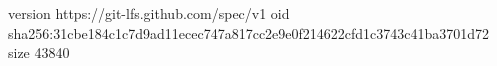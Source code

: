 version https://git-lfs.github.com/spec/v1
oid sha256:31cbe184c1c7d9ad11ecec747a817cc2e9e0f214622cfd1c3743c41ba3701d72
size 43840
